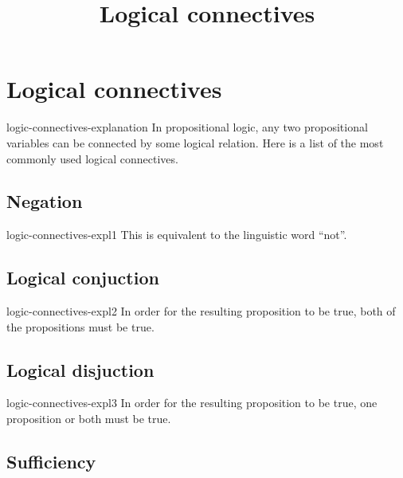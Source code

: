 \documentclass[preview]{standalone}
\begin{document}
\title{Logical connectives}
\genpage

\section{Logical connectives}

\begin{snippet}{logic-connectives-explanation}
In propositional logic, any two propositional variables can be connected by some logical relation.
Here is a list of the most commonly used logical connectives.

\end{snippet}

\subsection{Negation}


\begin{snippet}{logic-connectives-expl1}
This is equivalent to the linguistic word ``not''.
\end{snippet}

\subsection{Logical conjuction}


\begin{snippet}{logic-connectives-expl2}
In order for the resulting proposition to be true, both of the propositions
must be true.
\end{snippet}

\subsection{Logical disjuction}


\begin{snippet}{logic-connectives-expl3}
In order for the resulting proposition to be true, one proposition
or both must be true.
\end{snippet}

\subsection{Sufficiency}
\end{document}
